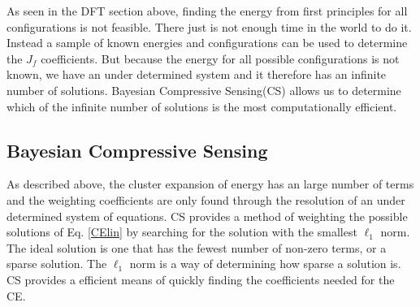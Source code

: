 \documentclass{article}
\begin{document}
As seen in the DFT section above, finding the energy from first principles for all configurations is not feasible. There just is not enough time in the world to do it. Instead a sample of known energies and configurations can be used to determine the $J_f$ coefficients. But because the energy for all possible configurations is not known, we have an under determined system and it therefore has an infinite number of solutions. Bayesian Compressive Sensing(CS) allows us to determine which of the infinite number of solutions is the most computationally efficient.

\subsection{Bayesian Compressive Sensing}

As described above, the cluster expansion of energy has an large number of terms and the weighting coefficients are only found through the resolution of an under determined system of equations. CS provides a method of weighting the possible solutions of Eq. \ref{CElin} by searching for the solution with the smallest $\ell_1$ norm\cite{PhysRevB.88.155105}. The ideal solution is one that has the fewest number of non-zero terms, or a sparse solution. The $\ell_1$ norm is a way of determining how sparse a solution is. CS provides a efficient means of quickly finding the coefficients needed for the CE.
\end{document}
